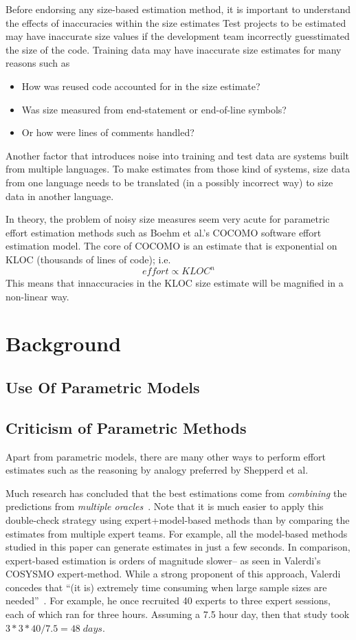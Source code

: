 \documentclass[final,twocolumn,5p]{elsarticle}
\newcommand{\bi}{\begin{itemize}[leftmargin=0.4cm]}
\newcommand{\ei}{\end{itemize}}
\begin{document}
Before endorsing any size-based estimation method,
it is important to understand the effects of inaccuracies 
within the size estimates
Test projects to be estimated may have inaccurate size  values if
the development team incorrectly guesstimated the size of
the code.
Training data may have inaccurate size estimates
for many reasons such as
\bi
\item How was reused code accounted
for in the size estimate?
\item  Was size measured from end-statement
or end-of-line symbols?
\item Or how were lines of comments handled?
\ei
Another factor that introduces noise into training and test
data are systems built from multiple languages. 
To make estimates from  those kind
of systems, size data from  one language needs to be translated (in a possibly incorrect way) to size data in another language.

In theory, the  problem of noisy size measures seem very acute for parametric effort estimation
methods such as Boehm et al.'s COCOMO software effort estimation model.
The core of COCOMO  is an estimate that is exponential on KLOC (thousands of lines of code); i.e.
\[
\mathit{effort} \propto \mathit{KLOC}^n
\]
This means that innaccuracies in the 
 KLOC size estimate will be magnified in a non-linear way.
 

\section{Background}
\subsection{Use Of Parametric Models}

 
 
 \subsection{Criticism of Parametric Methods}
 
 Apart from parametric models, there are many
 other ways to perform effort estimates such
 as the reasoning by analogy preferred by Shepperd et al.
 
 Much research has concluded that the best estimations come from {\em combining} the predictions
from {\em multiple oracles}~\cite{koc11a,chulani99,baker07,valerdi11}.  
Note that it is much easier to apply this double-check strategy using expert+model-based methods 
than by comparing the estimates from multiple expert teams.
For example, all the model-based methods  studied in this paper can generate estimates
in just a few seconds. In comparison, expert-based estimation is orders of magnitude slower-- as seen in  
Valerdi's  
COSYSMO expert-method.
While a strong proponent of this approach, Valerdi concedes that 
``(it is)  extremely time
consuming when large sample sizes are needed''~\cite{valerdi11}.
For example, he once
recruited 40 experts to three expert sessions, each of which ran for three hours.
Assuming a 7.5 hour day,
then that study took $3*3*40 /7.5 = 48\; \mathit{days}$.
\end{document}
